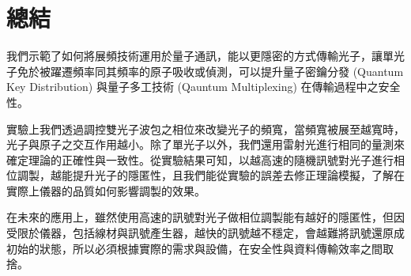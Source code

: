 \documentclass[class=NCU_thesis, crop=false]{standalone}
\begin{document}
\chapter{總結}
我們示範了如何將展頻技術運用於量子通訊，能以更隱密的方式傳輸光子，讓單光子免於被躍遷頻率同其頻率的原子吸收或偵測，可以提升量子密鑰分發 (Quantum Key Distribution) 與量子多工技術 (Qauntum Multiplexing) 在傳輸過程中之安全性。

實驗上我們透過調控雙光子波包之相位來改變光子的頻寬，當頻寬被展至越寬時，光子與原子之交互作用越小。除了單光子以外，我們還用雷射光進行相同的量測來確定理論的正確性與一致性。從實驗結果可知，以越高速的隨機訊號對光子進行相位調製，越能提升光子的隱匿性，且我們能從實驗的誤差去修正理論模擬，了解在實際上儀器的品質如何影響調製的效果。

在未來的應用上，雖然使用高速的訊號對光子做相位調製能有越好的隱匿性，但因受限於儀器，包括線材與訊號產生器，越快的訊號越不穩定，會越難將訊號還原成初始的狀態，所以必須根據實際的需求與設備，在安全性與資料傳輸效率之間取捨。
\end{document}
